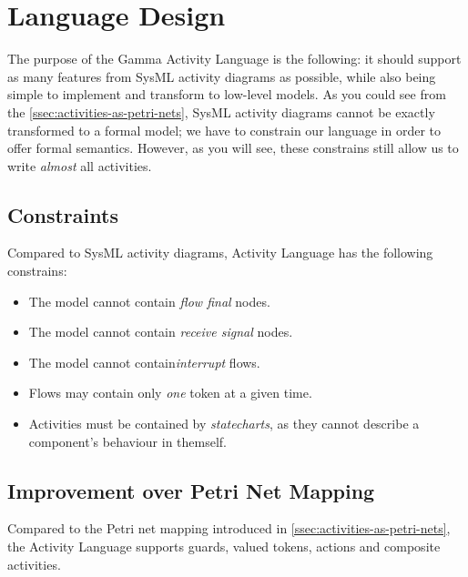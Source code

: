 \section{Language Design}

The purpose of the Gamma Activity Language is the following: it should support as many features from SysML activity diagrams as possible, while also being simple to implement and transform to low-level models.  As you could see from the \autoref{ssec:activities-as-petri-nets}, SysML activity diagrams cannot be exactly transformed to a formal model; we have to constrain our language in order to offer formal semantics. However, as you will see, these constrains still allow us to write \emph{almost} all activities.

\subsection{Constraints}

Compared to SysML activity diagrams, Activity Language has the following constrains:

\begin{itemize}
	\item The model cannot contain \emph{flow final} nodes.
	\item The model cannot contain \emph{receive signal} nodes.
	\item The model cannot contain\emph{interrupt} flows.
	\item Flows may contain only \emph{one} token at a given time.
	\item Activities must be contained by \emph{statecharts}, as they cannot describe a component's behaviour in themself.
\end{itemize}

\subsection{Improvement over Petri Net Mapping}

Compared to the Petri net mapping introduced in \autoref{ssec:activities-as-petri-nets}, the Activity Language supports guards, valued tokens, actions and composite activities.
